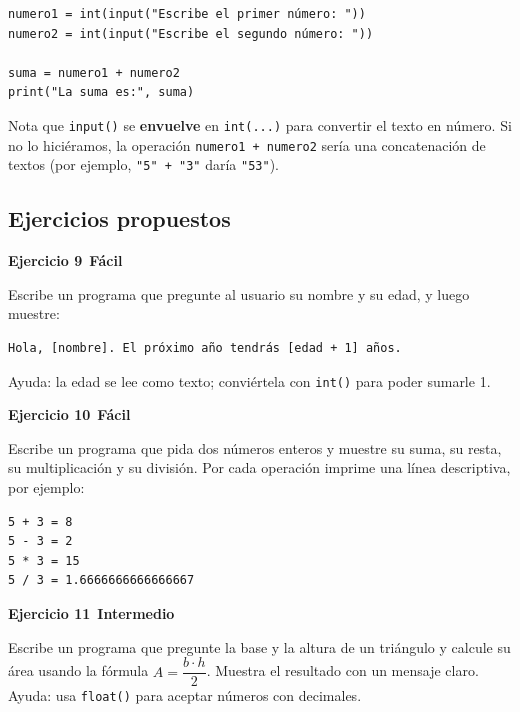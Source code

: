 \documentclass[11pt,a4paper]{article}
\newcommand{\facil}{\textcolor{verdeSignal}{\faIcon{circle}\,\textbf{Fácil}}}
\newcommand{\intermedio}{\textcolor{naranjaVivo}{\faIcon{circle}\,\textbf{Intermedio}}}
\begin{document}
\begin{cajaEjemplo}
\begin{lstlisting}[style=pythonStyle, caption={Suma de dos números}]
numero1 = int(input("Escribe el primer número: "))
numero2 = int(input("Escribe el segundo número: "))

suma = numero1 + numero2
print("La suma es:", suma)
\end{lstlisting}

Nota que \texttt{input()} se \textbf{envuelve} en \texttt{int(...)} para convertir el texto en número. Si no lo hiciéramos, la operación \texttt{numero1 + numero2} sería una concatenación de textos (por ejemplo, \texttt{"5" + "3"} daría \texttt{"53"}).
\end{cajaEjemplo}

\subsection{Ejercicios propuestos}

\begin{cajaEjercicio}
\textbf{Ejercicio 9} \facil

Escribe un programa que pregunte al usuario su nombre y su edad, y luego muestre:
\begin{lstlisting}[style=pythonStyle]
Hola, [nombre]. El próximo año tendrás [edad + 1] años.
\end{lstlisting}
Ayuda: la edad se lee como texto; conviértela con \texttt{int()} para poder sumarle 1.
\end{cajaEjercicio}

\begin{cajaEjercicio}
\textbf{Ejercicio 10} \facil

Escribe un programa que pida dos números enteros y muestre su suma, su resta, su multiplicación y su división. Por cada operación imprime una línea descriptiva, por ejemplo:
\begin{lstlisting}[style=pythonStyle]
5 + 3 = 8
5 - 3 = 2
5 * 3 = 15
5 / 3 = 1.6666666666666667
\end{lstlisting}
\end{cajaEjercicio}

\begin{cajaEjercicio}
\textbf{Ejercicio 11} \intermedio

Escribe un programa que pregunte la base y la altura de un triángulo y calcule su área usando la fórmula $A = \dfrac{b \cdot h}{2}$. Muestra el resultado con un mensaje claro. Ayuda: usa \texttt{float()} para aceptar números con decimales.
\end{cajaEjercicio}
\end{document}
